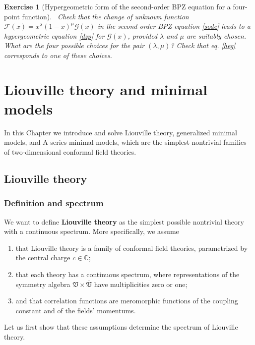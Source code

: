 \documentclass[12pt, a4paper, notitlepage, twoside]{report}
\numberwithin{equation}{section}
\theoremstyle{break}
\newtheorem{exo}{Exercise}[chapter]
\begin{document}
\begin{exo}[Hypergeometric form of the second-order BPZ equation for a four-point function]
 ~\label{exohge}
 Check that the change of unknown function $\mathcal{F}(x)=x^{\lambda}(1-x)^{\mu}\mathcal{G}(x)$ in the second-order BPZ equation \eqref{sode} leads to a hypergeometric equation \eqref{dzp} for $\mathcal{G}(x)$, provided $\lambda$ and $\mu$ are suitably chosen.
What are the four possible choices for the pair $(\lambda,\mu)$?
Check that eq. \eqref{heg} corresponds to one of these choices.
\end{exo}



\cleardoublepage

\chapter{Liouville theory and minimal models \label{seccbm}}

In this Chapter we introduce and solve Liouville theory, generalized minimal models, and A-series minimal models, which are the simplest nontrivial families of two-dimensional conformal field theories. 

\section{Liouville theory \label{secliou}}

\subsection{Definition and spectrum \label{secspe}}

We want to define \textbf{Liouville theory} as the simplest possible nontrivial theory with a continuous spectrum. More specifically, we assume
\begin{enumerate}
 \item that Liouville theory is a family of conformal field theories, parametrized by the central charge $c\in\mathbb{C}$;
\item that each theory has a continuous spectrum, where representations of the symmetry algebra $\mathfrak{V}\times\overline{\mathfrak{V}}$ have multiplicities zero or one;
\item and that correlation functions are meromorphic functions of the coupling constant and of the fields' momentums.
\end{enumerate}
Let us first show that these assumptions determine the spectrum of Liouville theory.
\end{document}

